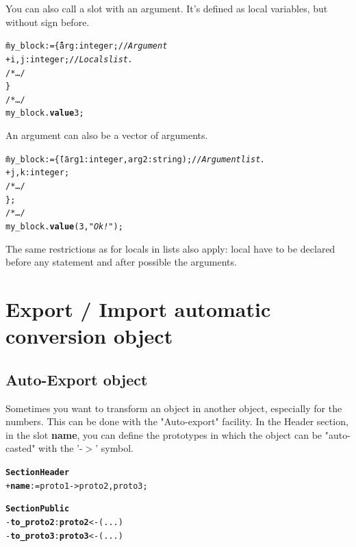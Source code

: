 \documentclass[11pt]{mybook}
\begin{document}
You can also call a slot with an argument. It's defined as local variables, but without sign before.
\begin{alltt}
\begin{tabbing}
  \=my\_block := \= \{ \= arg:{\sc{}integer};     // {\it{} Argument} \\
  \>             \>    \> + i,j:{\sc{}integer};   // {\it{} Locals list.} \\
  \>             \>    \> /* \ldots */ \\
  \>             \> \} \\
  \>/* \ldots */ \\
  \>my\_block.{\bf{}value} 3; \\
\end{tabbing}
\end{alltt}

An argument can also be a vector of arguments.
\begin{alltt}
\begin{tabbing}
  \=my\_block := \= \{ \= (arg1:{\sc{}integer}, arg2:{\sc{}string}); // {\it{} Argument list.} \\
  \>             \>    \> + j,k:{\sc{}integer}; \\
  \>             \>    \> /* \ldots */ \\
  \>             \> \}; \\
  \>/* \ldots */\\
  \>my\_block.{\bf{}value} (3,{\it{}"Ok !"}); \\
\end{tabbing}
\end{alltt}

The same restrictions as for locals in lists also apply: local have to be
declared before any statement and after possible the arguments.


\section{Export / Import automatic conversion object}
\label{language_reference:auto_cast}
%
\subsection{Auto-Export object}

Sometimes you want to transform an object in another object, especially for the numbers.
This can be done with the "Auto-export" facility.
In the Header section, in the slot {\bf{}name}, you can define the prototypes in which the object can be "auto-casted" with the '-$>$' symbol.
\begin{alltt}
{\bf{}Section Header}
  + {\bf{}name} := {\sc{}proto1 -> proto2,proto3};

{\bf{}Section Public}
  - {\bf{}to\_proto2}:{\bf{}proto2} <- ( ... )
  - {\bf{}to\_proto3}:{\bf{}proto3} <- ( ... )
\end{alltt}
    
\end{document}
